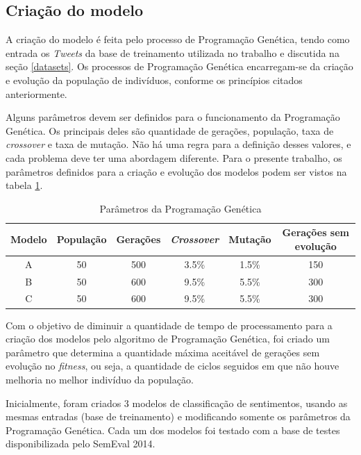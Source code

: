 \documentclass[12pt]{article}
\begin{document}
\subsection{Criação do modelo}

A criação do modelo é feita pelo processo de Programação Genética, tendo como entrada os \emph{Tweets} da base de treinamento utilizada no trabalho e discutida na seção \ref{datasets}. Os processos de Programação Genética encarregam-se da criação e evolução da população de indivíduos, conforme os princípios citados anteriormente.

Alguns parâmetros devem ser definidos para o funcionamento da Programação Genética. Os principais deles são quantidade de gerações, população, taxa de \emph{crossover} e taxa de mutação. Não há uma regra para a definição desses valores, e cada problema deve ter uma abordagem diferente. Para o presente trabalho, os parâmetros definidos para a criação e evolução dos modelos podem ser vistos na tabela \ref{parametersGP}.

\begin{table}[H]
	\centering
	\begin{tabular}{cccccc}
	\textbf{Modelo} & \textbf{População} & \textbf{Gerações} & \textbf{\emph{Crossover}} & \textbf{Mutação} & \textbf{Gerações sem evolução} \\ \hline
	A & 50 & 500 & 3.5\% & 1.5\% & 150 \\ \hline
	B & 50 & 600 & 9.5\% & 5.5\% & 300 \\ \hline
	C & 50 & 600 & 9.5\% & 5.5\% & 300 \\ \hline
	\end{tabular}
	\caption{Parâmetros da Programação Genética}
	\label{parametersGP}
\end{table}

Com o objetivo de diminuir a quantidade de tempo de processamento para a criação dos modelos pelo algoritmo de Programação Genética, foi criado um parâmetro que determina a quantidade máxima aceitável de gerações sem evolução no \emph{fitness}, ou seja, a quantidade de ciclos seguidos em que não houve melhoria no melhor indivíduo da população. 

Inicialmente, foram criados 3 modelos de classificação de sentimentos, usando as mesmas entradas (base de treinamento) e modificando somente os parâmetros da Programação Genética. Cada um dos modelos foi testado com a base de testes disponibilizada pelo SemEval 2014.
\end{document}
